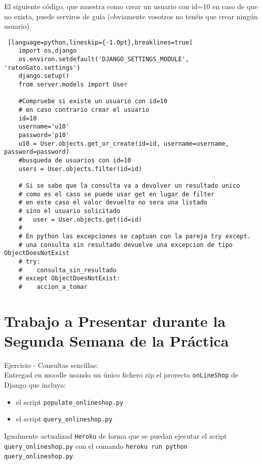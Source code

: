 \documentclass[12pt]{article} %
\newcounter{ejercicioNo}
\newcommand{\proyecto}{\texttt{onlineshop}}%
\newcommand{\heroku}{\texttt{Heroku}}
\newcommand{\populatescript}{\texttt{populate\_\proyecto.py}}
\begin{document}
El siguiente código, que muestra como crear un usuario con id=10 en caso de que no exista, puede serviros de guía (obviamente vosotros no tenéis que crear ningún usuario).

\begin{lstlisting} [language=python,lineskip={-1.0pt},breaklines=true]
    import os,django
    os.environ.setdefault('DJANGO_SETTINGS_MODULE', 'ratonGato.settings')
    django.setup()
    from server.models import User
    
    #Compruebe si existe un usuario con id=10
    # en caso contrario crear el usuario
    id=10
    username='u10'
    password='p10'
    u10 = User.objects.get_or_create(id=id, username=username, password=password)
    #busqueda de usuarios con id=10
    users = User.objects.filter(id=id)
    
    # Si se sabe que la consulta va a devolver un resultado unico
    # como es el caso se puede usar get en lugar de filter
    # en este caso el valor devuelto no sera una listado
    # sino el usuario solicitado
    #   user = User.objects.get(id=id)
    #
    # En python las excepciones se captuan con la pareja try except.
    # una consulta sin resultado devuelve una excepcion de tipo ObjectDoesNotExist
    # try:
    #    consulta_sin_resultado
    # except ObjectDoesNotExist:
    #    accion_a_tomar
\end{lstlisting}


\section{Trabajo a Presentar durante la Segunda Semana de la Práctica} %


\begin{minipage}{\linewidth}
\begin{framed}
\addtocounter{ejercicioNo}{1} 
Ejercicio  - Consultas sencillas:\\
Entregad en moodle usando un único fichero zip el proyecto \texttt{onLineShop} de Django que incluya:
 \begin{itemize}
   \item el script \populatescript 
   \item el script \texttt{query\_onlineshop.py} 
 \end{itemize}
 Igualmente actualizad \heroku{} de forma que se puedan ejecutar el script \texttt{query\_onlineshop.py} con el comando \texttt{heroku run python query\_onlineshop.py}. 

\end{framed}
\end{minipage}
\end{document}

